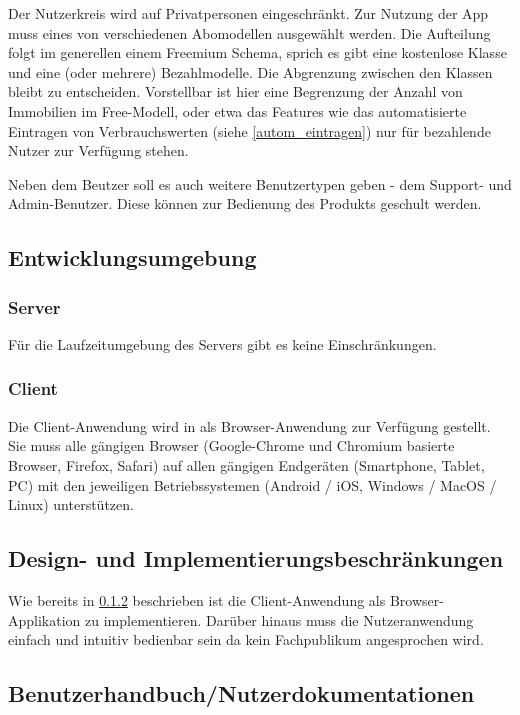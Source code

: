 Der Nutzerkreis wird auf Privatpersonen eingeschränkt.
Zur Nutzung der App muss eines von verschiedenen Abomodellen ausgewählt werden.
Die Aufteilung folgt im generellen einem \glqq{}Freemium\grqq{} Schema, sprich es gibt eine kostenlose Klasse und eine (oder mehrere) Bezahlmodelle. Die Abgrenzung zwischen den Klassen bleibt zu entscheiden. Vorstellbar ist hier eine Begrenzung der Anzahl von Immobilien im Free-Modell, oder etwa das Features wie das automatisierte Eintragen von Verbrauchswerten (siehe \ref{autom_eintragen}) nur für bezahlende Nutzer zur Verfügung stehen.

Neben dem Beutzer soll es auch weitere Benutzertypen geben - dem Support- und Admin-Benutzer. Diese können zur Bedienung des Produkts geschult werden.

\subsection{Entwicklungsumgebung}

\subsubsection{Server}

Für die Laufzeitumgebung des Servers gibt es keine Einschränkungen.

\subsubsection{Client}
\label{subsec:OEclient}
Die Client-Anwendung wird in als Browser-Anwendung zur Verfügung gestellt. Sie muss alle gängigen Browser (Google-Chrome und Chromium basierte Browser, Firefox, Safari) auf allen gängigen Endgeräten (Smartphone, Tablet, PC) mit den jeweiligen Betriebssystemen (Android / iOS, Windows / MacOS / Linux) unterstützen.

\subsection{Design- und Implementierungsbeschränkungen}

Wie bereits in \ref{subsec:OEclient} beschrieben ist die Client-Anwendung als Browser-Applikation zu implementieren. Darüber hinaus muss die Nutzeranwendung einfach und intuitiv bedienbar sein da kein Fachpublikum angesprochen wird.

\subsection{Benutzerhandbuch/Nutzerdokumentationen}

